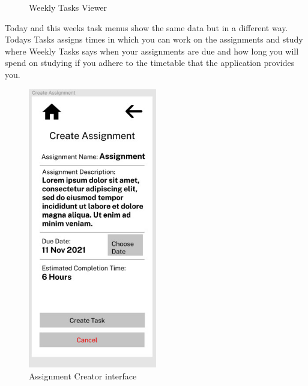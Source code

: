 \documentclass{article}
\begin{document}
\begin{figure}[h!]
\begin{minipage}{0.5\textwidth}
			\caption{Weekly Tasks Viewer}
		\end{minipage}
	\end{figure} 
	Today and this weeks task menus show the same data but in a different way. Todays Tasks assigns times in which you can work on the assignments and study where Weekly Tasks says when your assignments are due and how long you will spend on studying if you adhere to the timetable that the application provides you.\\
	\begin{figure}[h!]
		\centering
		\begin{minipage}{0.5\textwidth}
			\centering
			\includegraphics[width=0.5\textwidth]{createassignment.jpg}
			\caption{Assignment Creator interface}
		\end{minipage}%
		\begin{minipage}{0.5\textwidth}
			\centering

\end{minipage}
\end{figure}
\end{document}
